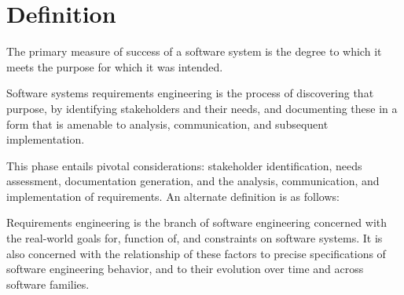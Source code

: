 \section{Definition}

The primary measure of success of a software system is the degree to which it meets the purpose for which it was intended.
\begin{definition}
    Software systems requirements engineering is the process of discovering that purpose, by identifying stakeholders and their needs, and documenting these in a form that is amenable to analysis, communication, and subsequent implementation. 
\end{definition}
This phase entails pivotal considerations: stakeholder identification, needs assessment, documentation generation, and the analysis, communication, and implementation of requirements. 
An alternate definition is as follows:
\begin{definition}
    Requirements engineering is the branch of software engineering concerned with the real-world goals for, function of, and constraints on software systems. 
    It is also concerned with the relationship of these factors to precise specifications of software engineering behavior, and to their evolution over time and across software families. 
\end{definition}